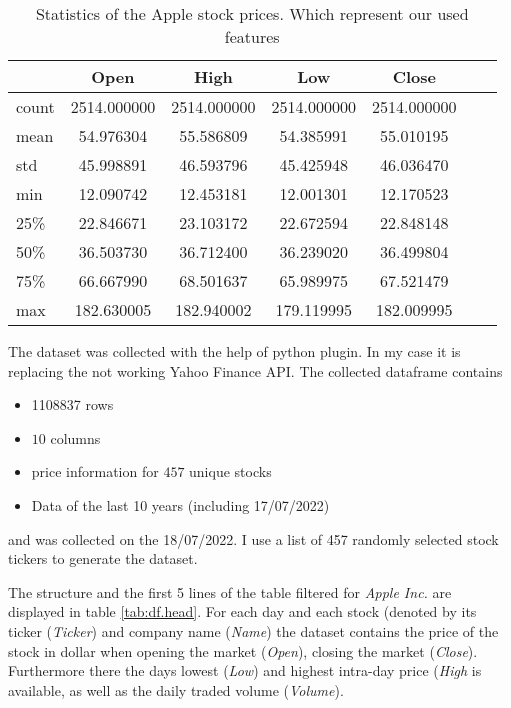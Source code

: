 \documentclass[fleqn,10pt]{SelfArx} %
\begin{document}
\begin{table*}[hbt]
	\caption{Statistics of the Apple stock prices. Which represent our used features}
	\centering
\begin{tabular}{lS[table-auto-round,table-format=9.1] S[table-auto-round,table-format=9.1] S[table-auto-round,table-format=9.1] S[table-auto-round,table-format=9.1]S[table-auto-round,scientific-notation = engineering, table-format=-1.1e-1]  S[table-auto-round,table-format=9.0]}
\toprule
{} &         {Open} &         {High} &          {Low}&        {Close}              \\
\midrule
count &  2514.000000 &  2514.000000 &  2514.000000 &  2514.000000  \\
mean  &    54.976304 &    55.586809 &    54.385991 &    55.010195 \\
std   &    45.998891 &    46.593796 &    45.425948 &    46.036470  \\
min   &    12.090742 &    12.453181 &    12.001301 &    12.170523  \\
25\%   &    22.846671 &    23.103172 &    22.672594 &    22.848148 \\
50\%   &    36.503730 &    36.712400 &    36.239020 &    36.499804  \\
75\%   &    66.667990 &    68.501637 &    65.989975 &    67.521479  \\
max   &   182.630005 &   182.940002 &   179.119995 &   182.009995  \\
\bottomrule
\end{tabular}
	\label{tab:df.statistrics}
\end{table*}


The dataset was collected with the help of  python plugin. In my case it is replacing the not working Yahoo Finance API. The collected dataframe contains
\begin{itemize}[noitemsep] %
	\item \num{1108837} rows
	\item $10$ columns
	\item price information for $457$ unique stocks
	\item Data of the last 10 years (including 17/07/2022)
\end{itemize} and was collected on the 18/07/2022. I use a list of 457 randomly selected stock tickers to generate the dataset. 

The structure and the first 5 lines of the table filtered for \textit{Apple Inc.} are displayed in table \ref{tab:df.head}. For each day and each stock (denoted by its ticker (\textit{Ticker}) and company name (\textit{Name}) the dataset contains the price of the stock in dollar 
when opening the market (\textit{Open}), closing the market (\textit{Close}). Furthermore there the days lowest (\textit{Low}) and highest 
intra-day price (\textit{High} is available, as well as the daily traded volume (\textit{Volume}).
\end{document}
